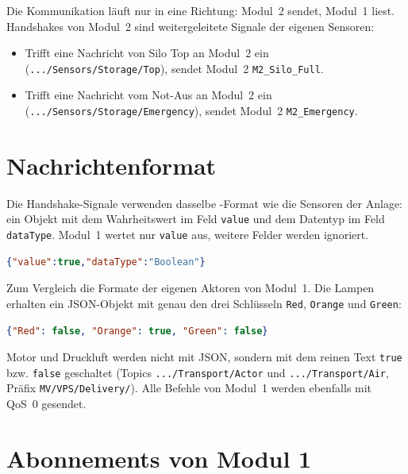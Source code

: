 Die Kommunikation läuft nur in eine Richtung: Modul~2 sendet, Modul~1 liest. 
Handshakes von Modul~2 sind weitergeleitete Signale der eigenen Sensoren:

\begin{itemize}[before=\raggedright]
  \item Trifft eine Nachricht von Silo Top an Modul~2 ein
        (\texttt{.../Sensors/Storage/Top}), sendet Modul~2 \texttt{M2\_Silo\_Full}.
  \item Trifft eine Nachricht vom Not-Aus an Modul~2 ein
        (\texttt{.../Sensors/Storage/Emergency}), sendet Modul~2 \texttt{M2\_Emergency}.
\end{itemize}

\section{Nachrichtenformat}

Die Handshake-Signale verwenden dasselbe -Format wie die
Sensoren der Anlage: ein Objekt mit dem Wahrheitswert im Feld \texttt{value}
und dem Datentyp im Feld \texttt{dataType}. Modul~1 wertet nur \texttt{value}
aus, weitere Felder werden ignoriert.

\begin{lstlisting}[language=json, caption={Payload eines Handshake-Signals}, label={lst:handshake}]
{"value":true,"dataType":"Boolean"}
\end{lstlisting}

Zum Vergleich die Formate der eigenen Aktoren von Modul~1. Die Lampen erhalten
ein JSON-Objekt mit genau den drei Schlüsseln \texttt{Red}, \texttt{Orange}
und \texttt{Green}:

\begin{lstlisting}[language=json, caption={Payload der Lampen (Topic MV/VPS/Delivery/Lamps)}, label={lst:lampen}]
{"Red": false, "Orange": true, "Green": false}
\end{lstlisting}

Motor und Druckluft werden nicht mit JSON, sondern mit dem reinen Text
\texttt{true} bzw. \texttt{false} geschaltet (Topics \texttt{.../Transport/Actor}
und \texttt{.../Transport/Air}, Präfix \texttt{MV/VPS/Delivery/}). Alle Befehle von
Modul~1 werden ebenfalls mit QoS~0 gesendet.

\section{Abonnements von Modul 1}

